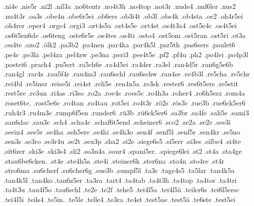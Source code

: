 {    .ni4e
    .nie5r
    .ni2l
    .nil3a
    .no6tentr
    .no4t3h
    .no4top
    .not3r
    .nude4
    .nul6ler
    .nus2
    .nu4t3r
    .oa3s
    .obe4n
    .obe6r5ei
    .ob6ers
    .ob3i4t
    .ob3l
    .obs4k
    .ob4sta
    .oe2
    .oh4r5ei
    .oh4rer
    .oper4
    .orge4
    .orgi3
    .ort4s5a
    .ort4s5e
    .ort4st
    .os4t3a4
    .ost5e4c
    .os4t5ei
    .os6t5en6de
    .os6teng
    .oste6r5e
    .os4tes
    .os4ti
    .osto4
    .ost5om
    .ost5ran
    .ost5ri
    .ot3a
    .ou4te
    .ozo2
    .ölk2
    .pa3b2
    .pa4nen
    .par4ka
    .par4k5l
    .par5th
    .pas6sers
    .paulet6
    .pe4c
    .pe3la
    .pel4za
    .pel4zw
    .pe3na
    .peri3
    .pes4t5e
    .pf2
    .pf4u
    .ph2
    .po4lei
    .po4p3l
    .postei6
    .prach4
    .pu5ert
    .ra5ch6e
    .ra4d5ei
    .ra4der
    .ra3el
    .ran4d5r
    .ran6g5e6b
    .ran4gl
    .rar4s
    .rau5f4r
    .rau4m3
    .rau6schl
    .rau6schw
    .rau4se
    .re4b3l
    .re5cha
    .re5chr
    .rei4bl
    .re5insz
    .reise5i
    .rei4st
    .reli5e
    .ren4n5a
    .re3sk
    .rester6
    .res6t5ers
    .re5stit
    .rest5re
    .re3un
    .ri4as
    .ri3so
    .ro2a
    .roe4s
    .roes5c
    .ro4h3a
    .roher4
    .ro6h5erz
    .rom4a
    .roset6te.
    .rost5e6c
    .ro4tan
    .ro4tau
    .rot5ei
    .ro4t3r
    .rö2s
    .rös3c
    .rue3b
    .rue6ck5er6
    .ruh4r3
    .ru4m3e
    .rump6f5en
    .runder6
    .rü3b
    .rü6ck5er6
    .sa3br
    .sa4fe
    .sali5e
    .sami3
    .san6dac
    .sau3c
    .sch4
    .scha4c
    .schaf6t5end
    .scheiner6
    .sco2
    .se2a
    .se2e
    .see3i
    .seein4
    .see5r
    .se4ha
    .seh5ere
    .se4hi
    .se4h3o
    .sen4f
    .senf5l
    .senf5r
    .sen4kr
    .se5no
    .sen3s
    .se3ro
    .se3r4u
    .se2t
    .sex3p
    .sha2
    .si2e
    .siege6s5
    .si5err
    .si3es
    .silbe4
    .si4te
    .sit6zer
    .ski3e
    .ski3s4
    .sli2
    .so3n4a
    .sour4
    .spani5er.
    .spiege6lei
    .st2
    .st4a
    .sta4ge
    .stau6be6cken.
    .st4e
    .ste4h5a
    .ste4i
    .steiner6k
    .ster6na
    .sto4n
    .sto4re
    .st4r
    .stro6ma
    .su6cherf
    .su6cher6g
    .sue3b
    .sumpf5l
    .ta3c
    .tage4s5
    .ta5lar
    .tan4k5a
    .tan4k5l
    .tan4ko
    .tan6z5er
    .ta3ra
    .tart4
    .ta4tab
    .ta4t3h
    .ta4top
    .ta4tor
    .ta4tri
    .ta4t3u
    .tau4f5o
    .tau6schl
    .te2e
    .te2f
    .tehe5
    .tei4l5a
    .tei4l5ä
    .teiler6s
    .tei6l5ersc
    .tei4l5i
    .teils4
    .te5in.
    .te5le
    .telle4
    .te3ra
    .te4st
    .test5ae
    .test5ä
    .te6ste
    .test5ei
}
